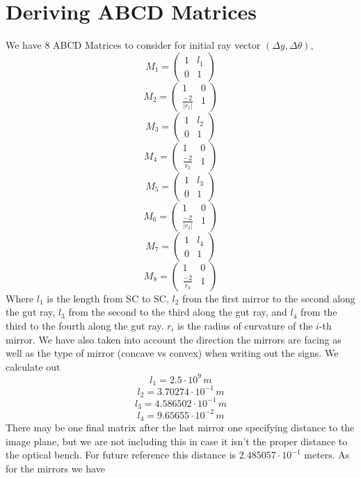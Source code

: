 \documentclass[11pt]{amsart}
\makeatletter
\newcommand{\0}{\varnothing}		%
\newcommand{\ti}{\cdot}			%
\newcommand{\abs}[1]{\left \lvert #1 \right \rvert}	%
\newcommand{\1}{!}
\newcommand{\2}{@}
\newcommand{\3}{\#}
\newcommand{\4}{\$}
\newcommand{\5}{\%}
\newcommand{\6}{$^\wedge$}
\newcommand{\7}{\&}
\newcommand{\8}{*}
\newcommand{\9}{(}
\makeatother
\begin{document}
\section{Deriving ABCD Matrices}
We have 8 ABCD Matrices to consider for initial ray vector $(\Delta y, \Delta \theta)$,
\[
M_1 = \begin{pmatrix} 1	&	l_1\\	0	&	1 \end{pmatrix}
\]
\[
M_2 = \begin{pmatrix} 1&0\\ \frac{-2}{\abs{r_1}} & 1
\end{pmatrix}
\]
\[
M_3=
\begin{pmatrix}
1	&	l_2	\\	0	&	1
\end{pmatrix}
\]
\[
M_4=
\begin{pmatrix}
1	&	0	\\	\frac{-2}{r_2}	&	1
\end{pmatrix}
\]
\[
M_5=
\begin{pmatrix}
1	&	l_3	\\	0	&	1
\end{pmatrix}
\]
\[
M_6=
\begin{pmatrix}
1	&	0	\\	\frac{-2}{\abs{r_3}}	&	1
\end{pmatrix}
\]
\[
M_7=
\begin{pmatrix}
1	&	l_4	\\	0	&	1
\end{pmatrix}
\]
\[
M_8=
\begin{pmatrix}
1	&	0	\\	\frac{-2}{r_4}	&	1
\end{pmatrix}
\]
Where $l_1$ is the length from SC to SC, $l_2$ from the first mirror to the second along the gut ray, $l_3$ from the second to the third along the gut ray, and $l_4$ from the third to the fourth along the gut ray. $r_i$ is the radius of curvature of the $i$-th mirror. We have also taken into account the direction the mirrors are facing as well as the type of mirror (concave vs convex) when writing out the signs. We calculate out
\[
l_1 = 2.5\ti 10^9\,m
\]
\[
l_2 =3.70274\ti 10^{-1}\,m
\]
\[
l_3 = 4.586502\ti 10^{-1}\, m
\]
\[
l_4 = 9.65655 \ti 10^{-2}\,m
\]
There may be one final matrix after the last mirror one specifying distance to the image plane, but we are not including this in case it isn't the proper distance to the optical bench. For future reference this distance is $2.485057 \ti 10^{-1}$ meters. As for the mirrors we have
\end{document}
